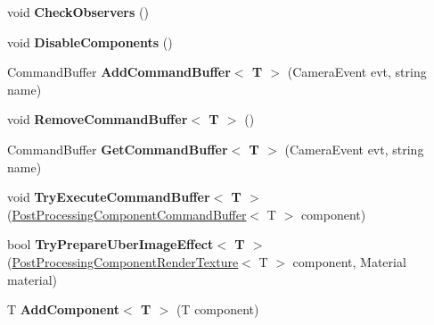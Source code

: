 \begin{DoxyCompactItemize}
void {\bfseries Check\+Observers} ()
\item 
\mbox{\label{class_unity_engine_1_1_post_processing_1_1_post_processing_behaviour_a62ad48d587ccb6bd5cf278c5f9c250ce}} 
void {\bfseries Disable\+Components} ()
\item 
\mbox{\label{class_unity_engine_1_1_post_processing_1_1_post_processing_behaviour_a239edd13dd36850eb294dc2274956dbb}} 
Command\+Buffer {\bfseries Add\+Command\+Buffer$<$ T $>$} (Camera\+Event evt, string name)
\item 
\mbox{\label{class_unity_engine_1_1_post_processing_1_1_post_processing_behaviour_a8624bc2c102255242d0aea59f7a6f997}} 
void {\bfseries Remove\+Command\+Buffer$<$ T $>$} ()
\item 
\mbox{\label{class_unity_engine_1_1_post_processing_1_1_post_processing_behaviour_a4701b2157fb380c7991f2fc0746bbc55}} 
Command\+Buffer {\bfseries Get\+Command\+Buffer$<$ T $>$} (Camera\+Event evt, string name)
\item 
\mbox{\label{class_unity_engine_1_1_post_processing_1_1_post_processing_behaviour_a7e4ac0aacc4396830371b8ea8bfc8dc4}} 
void {\bfseries Try\+Execute\+Command\+Buffer$<$ T $>$} (\hyperlink{class_unity_engine_1_1_post_processing_1_1_post_processing_component_command_buffer}{Post\+Processing\+Component\+Command\+Buffer}$<$ T $>$ component)
\item 
\mbox{\label{class_unity_engine_1_1_post_processing_1_1_post_processing_behaviour_ad7c082b745dda02b996c3995741f49b6}} 
bool {\bfseries Try\+Prepare\+Uber\+Image\+Effect$<$ T $>$} (\hyperlink{class_unity_engine_1_1_post_processing_1_1_post_processing_component_render_texture}{Post\+Processing\+Component\+Render\+Texture}$<$ T $>$ component, Material material)
\item 
\mbox{\label{class_unity_engine_1_1_post_processing_1_1_post_processing_behaviour_a472f4ab59c0a4adc0ebc8f75c78f6e59}} 
T {\bfseries Add\+Component$<$ T $>$} (T component)
\end{DoxyCompactItemize}
